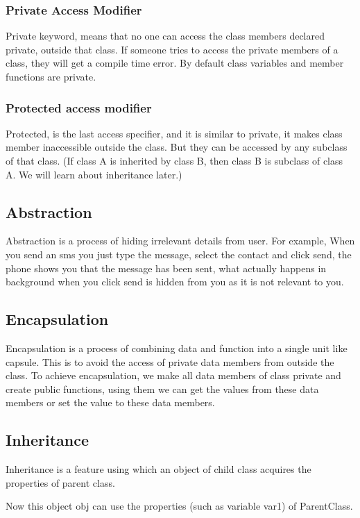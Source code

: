 \documentclass[11pt, a4paper]{article}
\begin{document}
\subsubsection{Private Access Modifier}
Private keyword, means that no one can access the class members declared private,
outside that class. If someone tries to access the private members of a class, they
will get a compile time error. By default class variables and member functions are private.


\subsubsection{Protected access modifier}
Protected, is the last access specifier, and it is similar to private,
it makes class member inaccessible outside the class. But they can be accessed
by any subclass of that class. (If class A is inherited by class B, then class B
is subclass of class A. We will learn about inheritance later.)


\subsection{Abstraction}
Abstraction is a process of hiding irrelevant details from user. For example,
When you send an sms you just type the message, select the contact and click send,
the phone shows you that the message has been sent, what actually happens in background when you click
send is hidden from you as it is not relevant to you.

\subsection{Encapsulation}
Encapsulation is a process of combining data and function into a single unit like capsule.
This is to avoid the access of private data members from outside the class.
To achieve encapsulation, we make all data members of class private and create public
functions, using them we can get the values from these data members or set the value
to these data members.

\subsection{Inheritance}
Inheritance is a feature using which an object of child class acquires
the properties of parent class.

Now this object obj can use the properties (such as variable var1) of ParentClass.
\end{document}
